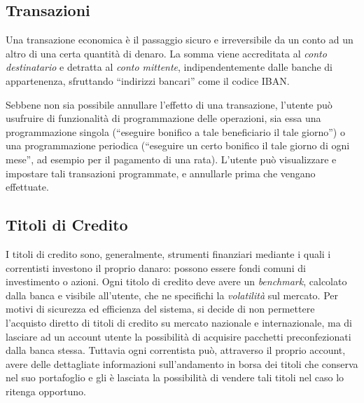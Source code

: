 \subsection{Transazioni}

Una transazione economica è il passaggio sicuro e irreversibile da un conto ad un altro di una certa quantità di denaro.
La somma viene accreditata al \emph{conto destinatario} e detratta al \emph{conto mittente}, indipendentemente dalle banche di appartenenza, sfruttando ``indirizzi bancari'' come il codice IBAN.

Sebbene non sia possibile annullare l'effetto di una transazione, l'utente pu\`o usufruire di funzionalit\`a di programmazione delle operazioni, sia essa una programmazione singola (``eseguire bonifico a tale beneficiario il tale giorno'') o una programmazione periodica (``eseguire un certo bonifico il tale giorno di ogni mese'', ad esempio per il pagamento di una rata).
L'utente pu\`o visualizzare e impostare tali transazioni programmate, e annullarle prima che vengano effettuate.


\subsection{Titoli di Credito}

I titoli di credito sono, generalmente, strumenti finanziari mediante i quali i correntisti investono il proprio danaro: possono essere fondi comuni di investimento o azioni.
Ogni titolo di credito deve avere un \emph{benchmark}, calcolato dalla banca e visibile all'utente, che ne specifichi la \emph{volatilità} sul mercato.
Per motivi di sicurezza ed efficienza del sistema, si decide di non permettere l'acquisto diretto di titoli di credito su mercato nazionale e internazionale, ma di lasciare ad un account utente la possibilità di acquisire pacchetti preconfezionati dalla banca stessa.
Tuttavia ogni correntista può, attraverso il proprio account, avere delle dettagliate informazioni sull'andamento in borsa dei titoli che conserva nel suo portafoglio  e gli è lasciata la possibilità di vendere tali titoli nel caso lo ritenga opportuno.

